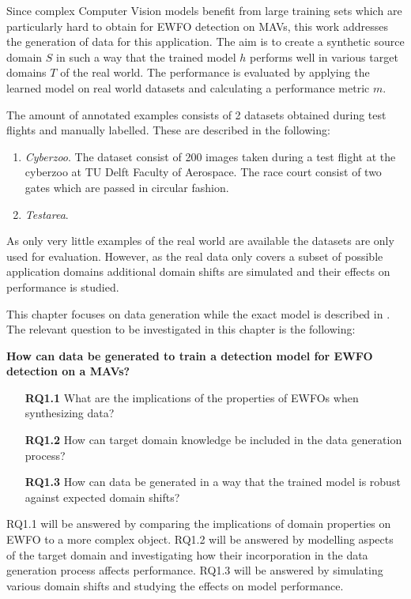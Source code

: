 Since complex Computer Vision models benefit from large training sets which are particularly hard to obtain for \ac{EWFO} detection on \acp{MAV}, this work addresses the generation of data for this application. The aim is to create a synthetic source domain $S$ in such a way that the trained model $h$ performs well in various target domains $T$ of the real world. The performance is evaluated by applying the learned model on real world datasets and calculating a performance metric $m$.

The amount of annotated examples consists of 2 datasets obtained during test flights and manually labelled. These are described in the following:

\begin{enumerate}
 \item \textit{Cyberzoo}. The dataset consist of 200 images taken during a test flight at the cyberzoo at TU Delft Faculty of Aerospace. The race court consist of two gates which are passed in circular fashion.
 \item \textit{Testarea}.  
\end{enumerate}

As only very little examples of the real world are available the datasets are only used for evaluation. However, as the real data only covers a subset of possible application domains additional domain shifts are simulated and their effects on performance is studied.

This chapter focuses on data generation while the exact model is described in .
The relevant question to be investigated in this chapter is the following:

\textbf{How can data be generated to train a detection model for \ac{EWFO} detection on a \acp{MAV}?}

\begin{enumerate}
	\item[\textbf{RQ1.1}]What are the implications of the properties of \acp{EWFO} when synthesizing data?
	\item[\textbf{RQ1.2}]How can target domain knowledge be included in the data generation process?
	\item[\textbf{RQ1.3}]How can data be generated in a way that the trained model is robust against expected domain shifts?
\end{enumerate}

RQ1.1 will be answered by comparing the implications of domain properties on \ac{EWFO} to a more complex object. RQ1.2 will be answered by modelling aspects of the target domain and investigating how their incorporation in the data generation process affects performance. RQ1.3 will be answered by simulating various domain shifts and studying the effects on model performance.

